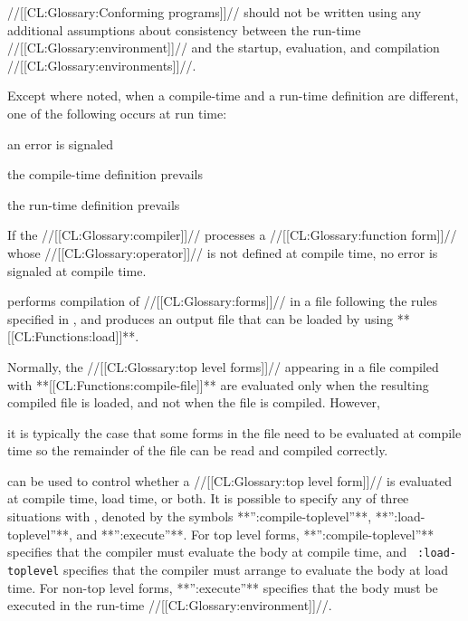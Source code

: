 \endlist 

//[[CL:Glossary:Conforming programs]]// should not be written using any additional
assumptions about consistency between the run-time 
//[[CL:Glossary:environment]]// and the startup, evaluation, and compilation 
//[[CL:Glossary:environments]]//.

Except where noted, when a compile-time and a run-time definition are
different, one of the following occurs at run time:

\beginlist
                                                          
\item{\bull} an error  is signaled
\item{\bull} the compile-time definition prevails
\item{\bull} the run-time definition prevails

\endlist
 
If the //[[CL:Glossary:compiler]]// processes a //[[CL:Glossary:function form]]// whose //[[CL:Glossary:operator]]// 
is not defined at compile time, no error is signaled at compile time.

\endsubsubsection%
\endsubSection%
 
 performs compilation of 
//[[CL:Glossary:forms]]// in a file following the rules specified in \secref\CompilationSemantics,
and produces an output file that can be loaded by using **[[CL:Functions:load]]**.
 
Normally, the //[[CL:Glossary:top level forms]]// appearing in a file compiled with
**[[CL:Functions:compile-file]]** are evaluated only when the resulting
compiled file is loaded, and not when the file is compiled.  However,


it is typically the case that some forms in the file need to be evaluated
at compile time so the
remainder of the file can be read and compiled correctly.

 can be used to control
whether a //[[CL:Glossary:top level form]]// is evaluated at compile time, load
time, or both.  It is possible to specify any of three situations with
, denoted by the symbols **'':compile-toplevel''**,
**'':load-toplevel''**, and **'':execute''**.  For top level 
 forms, **'':compile-toplevel''** specifies that the
compiler must evaluate the body at compile time, and {\tt
:load-toplevel} specifies that the compiler must arrange to evaluate
the body at load time. For non-top level  forms,
**'':execute''** specifies that the body must be executed in the run-time
//[[CL:Glossary:environment]]//.

